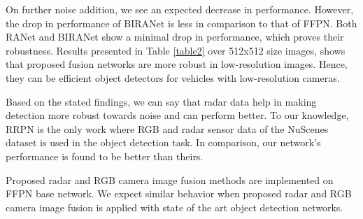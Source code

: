 \documentclass{article}
\begin{document}
\begin{table}[htbp]
\caption{Comparison of detection results on 512x512 image size.}
\label{table2}
\end{table}

On further noise addition, we see an expected decrease in performance. However, the drop in performance of BIRANet is less in comparison to that of FFPN.  Both RANet and BIRANet show a minimal drop in performance, which proves their robustness. Results presented in Table \ref{table2} over 512x512 size images, shows that proposed fusion networks are more robust in low-resolution images. Hence, they can be efficient object detectors for vehicles with low-resolution cameras.

Based on the stated findings, we can say that radar data help in making detection more robust towards noise and can perform better. To our knowledge, RRPN is the only work where RGB and radar sensor data of the NuScenes dataset is used in the object detection task. In comparison, our network's performance is found to be better than theirs.

Proposed radar and RGB camera image fusion methods are implemented on FFPN base network. We expect similar behavior when proposed radar and RGB camera image fusion is applied with state of the art object detection networks.



\end{document}
